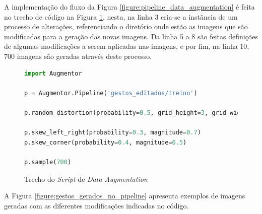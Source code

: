 
\par A implementação do fluxo da Figura \ref{figure:pipeline_data_augmentation} é feita no trecho de código na Figura \ref{figure:dataaugmentation}, nesta, na linha 3 cria-se a instância de um processo de alterações, referenciando o diretório onde estão as imagens que são modificadas para a geração das novas imagens. Da linha 5 a 8 são feitas definições de algumas modificações a serem aplicadas nas imagens, e por fim, na linha 10, 700 imagens são geradas através deste processo.

\begin{figure}[H]
    \centering
    \caption{Trecho do \textit{Script} de \textit{Data Augmentation}}
    \begin{lstlisting}[language=Python]
import Augmentor

p = Augmentor.Pipeline('gestos_editados/treino')

p.random_distortion(probability=0.5, grid_height=3, grid_width=3, magnitude=2)

p.skew_left_right(probability=0.3, magnitude=0.7)
p.skew_corner(probability=0.4, magnitude=0.5)

p.sample(700)
    \end{lstlisting}
    \label{figure:dataaugmentation}
\end{figure}


\par A Figura \ref{figure:gestos_gerados_no_pipeline} apresenta exemplos de imagens geradas com as diferentes modificações indicadas no código.

